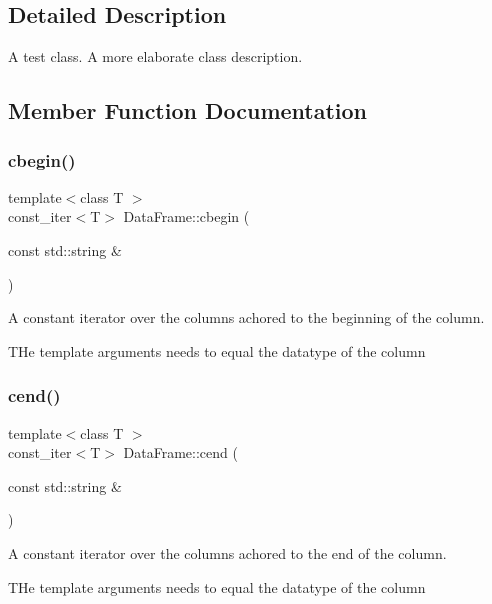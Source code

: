 \subsection{Detailed Description}
A test class. A more elaborate class description. 

\subsection{Member Function Documentation}
\mbox{\label{classDataFrame_a857dadee258495743462244022a2dcce}} 
\subsubsection{\texorpdfstring{cbegin()}{cbegin()}}
{\footnotesize\ttfamily template$<$class T $>$ \\
const\+\_\+iter$<$T$>$ Data\+Frame\+::cbegin (\begin{DoxyParamCaption}\item[{const std\+::string \&}]{ }\end{DoxyParamCaption})}



A constant iterator over the columns achored to the beginning of the column. 

T\+He template arguments needs to equal the datatype of the column \mbox{\label{classDataFrame_a895c45b1be67d772aed3fa10169a1038}} 
\subsubsection{\texorpdfstring{cend()}{cend()}}
{\footnotesize\ttfamily template$<$class T $>$ \\
const\+\_\+iter$<$T$>$ Data\+Frame\+::cend (\begin{DoxyParamCaption}\item[{const std\+::string \&}]{ }\end{DoxyParamCaption})}



A constant iterator over the columns achored to the end of the column. 

T\+He template arguments needs to equal the datatype of the column \mbox{\label{classDataFrame_ab65a5511fe18187411de973f99f196cd}} 
